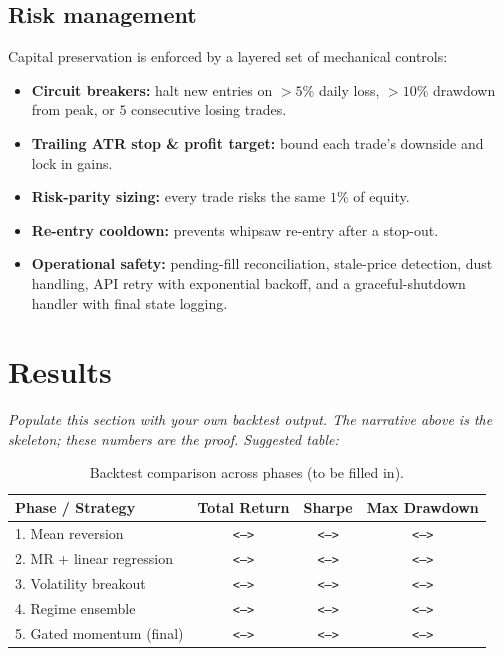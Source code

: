 \documentclass[11pt,a4paper]{article}
\begin{document}
\subsection{Risk management}
Capital preservation is enforced by a layered set of mechanical controls:
\begin{itemize}[noitemsep]
  \item \textbf{Circuit breakers:} halt new entries on $>5\%$ daily loss,
        $>10\%$ drawdown from peak, or $5$ consecutive losing trades.
  \item \textbf{Trailing ATR stop \& profit target:} bound each trade's downside
        and lock in gains.
  \item \textbf{Risk-parity sizing:} every trade risks the same $1\%$ of equity.
  \item \textbf{Re-entry cooldown:} prevents whipsaw re-entry after a stop-out.
  \item \textbf{Operational safety:} pending-fill reconciliation, stale-price
        detection, dust handling, API retry with exponential backoff, and a
        graceful-shutdown handler with final state logging.
\end{itemize}

\section{Results}
\noindent
\textit{Populate this section with your own backtest output. The narrative above
is the skeleton; these numbers are the proof. Suggested table:}

\begin{table}[h]
\centering
\small
\begin{tabular}{@{}lccc@{}}
\toprule
\textbf{Phase / Strategy} & \textbf{Total Return} & \textbf{Sharpe} & \textbf{Max Drawdown} \\
\midrule
1. Mean reversion              & \texttt{<--->} & \texttt{<--->} & \texttt{<--->} \\
2. MR + linear regression      & \texttt{<--->} & \texttt{<--->} & \texttt{<--->} \\
3. Volatility breakout         & \texttt{<--->} & \texttt{<--->} & \texttt{<--->} \\
4. Regime ensemble             & \texttt{<--->} & \texttt{<--->} & \texttt{<--->} \\
5. Gated momentum (final)      & \texttt{<--->} & \texttt{<--->} & \texttt{<--->} \\
\bottomrule
\end{tabular}
\caption{Backtest comparison across phases (to be filled in).}
\end{table}
\end{document}
